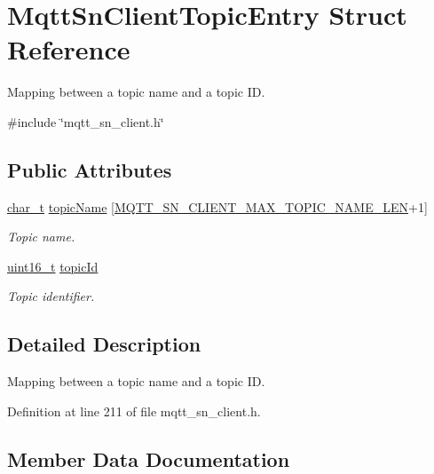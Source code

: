 \hypertarget{structMqttSnClientTopicEntry}{}\section{Mqtt\+Sn\+Client\+Topic\+Entry Struct Reference}
\label{structMqttSnClientTopicEntry}


Mapping between a topic name and a topic ID.  




{\ttfamily \#include \char`\"{}mqtt\+\_\+sn\+\_\+client.\+h\char`\"{}}

\subsection*{Public Attributes}
\begin{DoxyCompactItemize}
\item 
\hyperlink{compiler__port_8h_a40bb5262bf908c328fbcfbe5d29d0201}{char\+\_\+t} \hyperlink{structMqttSnClientTopicEntry_aa9954fa1c2040839258e0dbb8c283d9f}{topic\+Name} \mbox{[}\hyperlink{mqtt__sn__client_8h_a746a6fb4ce05f20c05f8a852a1e376e1}{M\+Q\+T\+T\+\_\+\+S\+N\+\_\+\+C\+L\+I\+E\+N\+T\+\_\+\+M\+A\+X\+\_\+\+T\+O\+P\+I\+C\+\_\+\+N\+A\+M\+E\+\_\+\+L\+EN}+1\mbox{]}
\begin{DoxyCompactList}\small\item\em Topic name. \end{DoxyCompactList}\item 
\hyperlink{stdint_8h_a273cf69d639a59973b6019625df33e30}{uint16\+\_\+t} \hyperlink{structMqttSnClientTopicEntry_ab9fed8efad100176e761b27031087f27}{topic\+Id}
\begin{DoxyCompactList}\small\item\em Topic identifier. \end{DoxyCompactList}\end{DoxyCompactItemize}


\subsection{Detailed Description}
Mapping between a topic name and a topic ID. 

Definition at line 211 of file mqtt\+\_\+sn\+\_\+client.\+h.



\subsection{Member Data Documentation}
\mbox{\label{structMqttSnClientTopicEntry_ab9fed8efad100176e761b27031087f27}} 
